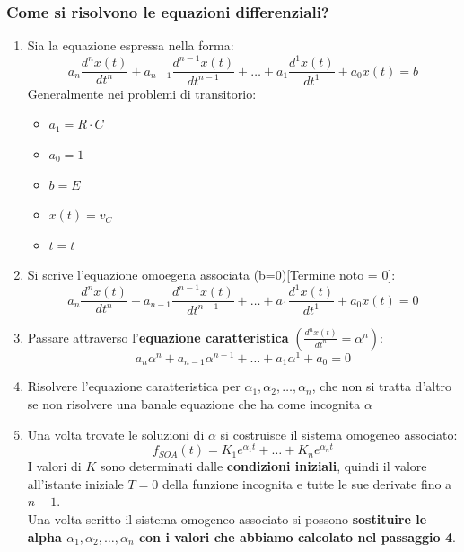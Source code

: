 \documentclass[../main.tex]{subfiles}
\begin{document}
	\subsubsection{Come si risolvono le equazioni differenziali?}
	\begin{enumerate}
		\item Sia la equazione espressa nella forma:
		\begin{equation}
			a_n\frac{d^nx(t)}{dt^n}+a_{n-1} \frac{d^{n-1}x(t)}{dt^{n-1}}	+ \dots + a_1\frac{d^1 x(t)}{dt^1} + a_0 x(t) = b
		\end{equation}
		Generalmente nei problemi di transitorio:
		\begin{itemize}
			\item $a_1 = R \cdot C$
			\item $a_0 = 1$
			\item $b = E$
			\item $x(t) = v_C$
			\item $t = t$
		\end{itemize}
		\item Si scrive l'equazione omoegena associata (b=0)[Termine noto = 0]:
		\begin{equation}
			a_n\frac{d^nx(t)}{dt^n}+a_{n-1} \frac{d^{n-1}x(t)}{dt^{n-1}}	+ \dots + a_1\frac{d^1 x(t)}{dt^1} + a_0 x(t) = 0
		\end{equation}
		\item Passare attraverso l'\textbf{equazione caratteristica} $\left( \frac{d^nx(t)}{dt^n} = \alpha^n \right)$:
		\begin{equation}
			a_n\alpha^n+a_{n-1}\alpha^{n-1}+\dots+a_1\alpha^1+a_0=0	
		\end{equation}
		\item Risolvere l'equazione caratteristica per $\alpha_1, \alpha_2, \dots, \alpha_n$, che non si tratta d'altro se non risolvere una banale equazione che ha come incognita $\alpha$
		\item Una volta trovate le soluzioni di $\alpha$ si costruisce il sistema omogeneo associato:
		\begin{equation}
			f_{SOA}(t)=K_1e^{\alpha_1t}+\dots+K_ne^{\alpha_nt}
		\end{equation}
		I valori di $K$ sono determinati dalle \textbf{condizioni iniziali}, quindi il valore all'istante iniziale $T=0$ della funzione incognita e tutte le sue derivate fino a $n-1$.\\
		Una volta scritto il sistema omogeneo associato si possono \textbf{sostituire le alpha $\alpha_1, \alpha_2, \dots, \alpha_n$ con i valori che abbiamo calcolato nel passaggio 4}.

\end{enumerate}
\end{document}
